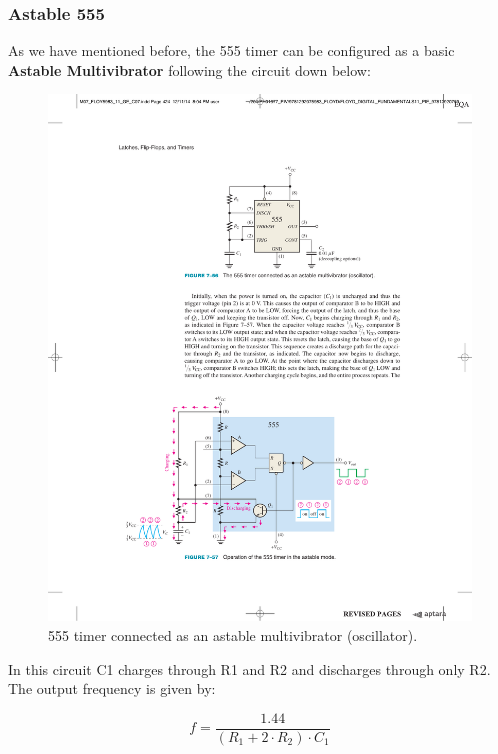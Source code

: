 \subsubsection{Astable 555}

As we have mentioned before, the 555 timer can be configured as a basic \textbf{Astable Multivibrator} following the circuit down below:

\begin{figure}[H]
    \centering
    \includegraphics[scale = 1]{Graphics/VHDL/Practice 2/GRAPHICS/555/GRAPHS/MODES/ASTABLE.pdf}
    \caption{555 timer connected as an astable multivibrator (oscillator). ~\autocite{FLOYD}}
    \label{fig:ASTABLE}
\end{figure}

In this circuit C1 charges through R1 and R2 and discharges through only R2. The output frequency is given by:

\begin{equation*}
    f = \frac{1.44}{(R_1 + 2\cdot R_2) \cdot C_1}
\end{equation*}


